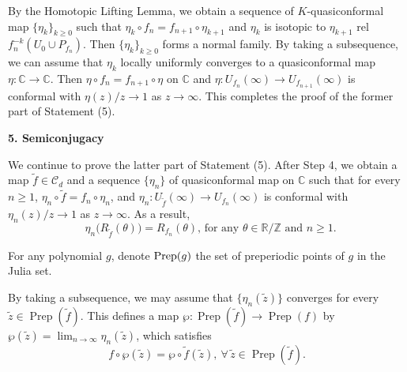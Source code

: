 \documentclass[a4paper,reqno,times, 11pt]{amsart}
\theoremstyle{remark}
\theoremstyle{plain}
\numberwithin{equation}{section}
\def\CCCC{\mathscr C}
\def\t{\tilde}
\def\R{\mbox{$\mathbb R$}}
\def\C{\mbox{$\mathbb C$}}
\def\Z{\mbox{$\mathbb Z$}}
\begin{document}
		By the Homotopic Lifting Lemma, we obtain a sequence of $K$-quasiconformal map $\{\eta_k\}_{k\geq0}$ such that $\eta_k\circ f_n=f_{n+1}\circ \eta_{k+1}$ and $\eta_k$ is isotopic to $\eta_{k+1}$ rel $f_n^{-k}(U_0\cup P_{f_n})$. Then $\{\eta_k\}_{k\geq0}$ forms a normal family. By taking a subsequence, we can assume that $\eta_k$ locally uniformly converges to a quasiconformal map $\eta: \mathbb{C} \to \mathbb{C}$. Then $\eta \circ f_n = f_{n+1} \circ \eta$ on $\C$ and $\eta:U_{f_n}(\infty)\to U_{f_{n+1}}(\infty)$ is conformal with $\eta(z)/z\to 1$ as $z\to\infty$. This completes the proof of the former part of Statement (5).
	\vspace{5pt}

{\bf 5. Semiconjugacy}\vspace{5pt}

We continue to prove the latter part of Statement (5). After Step 4, we obtain a map $\t{f}\in\CCCC_d$ and a sequence $\{\eta_n\}$ of quasiconformal map on $\C$ such that for every $n\geq1$, $\eta_n\circ \t{f}=f_n\circ \eta_n$, and 
$\eta_n:U_{\t{f}}(\infty)\to U_{f_{n}}(\infty)$ is conformal with $\eta_n(z)/z\to 1$ as $z\to\infty$.
 As a result,
 \begin{equation}\label{eq:3333}
 \text{ $\eta_n\big(R_{\t{f}}(\theta)\big)=R_{f_{n}}(\theta)$, for any $\theta\in\R/\Z$ and $n\geq1$.}
 \end{equation}

For any polynomial $g$, denote ${\rm Prep}(g)$ the set of preperiodic points of $g$ in the Julia set.\vspace{1pt}

By taking a subsequence, we may assume that $\{\eta_n(\tilde{z})\}$ converges for every $\tilde{z}\in \operatorname{Prep}(\tilde{f})$. This defines a map $\wp:\operatorname{Prep}(\tilde{f})\to\operatorname{Prep}(f)$ by $\wp(\tilde{z})=\lim_{n\to\infty}\eta_n(\tilde{z})$, which satisfies 
\begin{equation}\label{eq:4444}
f\circ\wp(\t{z})=\wp\circ\tilde{f}(\t{z}),\ \forall\, \t{z}\in \operatorname{Prep}(\tilde{f}).
\end{equation}
\end{document}

